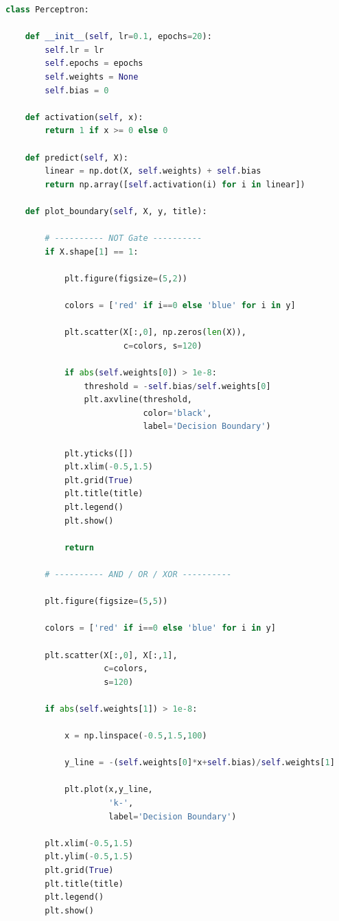 \documentclass[11pt]{article}
\begin{document}
\begin{lstlisting}[language=Python]
class Perceptron:

    def __init__(self, lr=0.1, epochs=20):
        self.lr = lr
        self.epochs = epochs
        self.weights = None
        self.bias = 0

    def activation(self, x):
        return 1 if x >= 0 else 0

    def predict(self, X):
        linear = np.dot(X, self.weights) + self.bias
        return np.array([self.activation(i) for i in linear])

    def plot_boundary(self, X, y, title):

        # ---------- NOT Gate ----------
        if X.shape[1] == 1:

            plt.figure(figsize=(5,2))

            colors = ['red' if i==0 else 'blue' for i in y]

            plt.scatter(X[:,0], np.zeros(len(X)),
                        c=colors, s=120)

            if abs(self.weights[0]) > 1e-8:
                threshold = -self.bias/self.weights[0]
                plt.axvline(threshold,
                            color='black',
                            label='Decision Boundary')

            plt.yticks([])
            plt.xlim(-0.5,1.5)
            plt.grid(True)
            plt.title(title)
            plt.legend()
            plt.show()

            return

        # ---------- AND / OR / XOR ----------

        plt.figure(figsize=(5,5))

        colors = ['red' if i==0 else 'blue' for i in y]

        plt.scatter(X[:,0], X[:,1],
                    c=colors,
                    s=120)

        if abs(self.weights[1]) > 1e-8:

            x = np.linspace(-0.5,1.5,100)

            y_line = -(self.weights[0]*x+self.bias)/self.weights[1]

            plt.plot(x,y_line,
                     'k-',
                     label='Decision Boundary')

        plt.xlim(-0.5,1.5)
        plt.ylim(-0.5,1.5)
        plt.grid(True)
        plt.title(title)
        plt.legend()
        plt.show()


\end{lstlisting}
\end{document}
